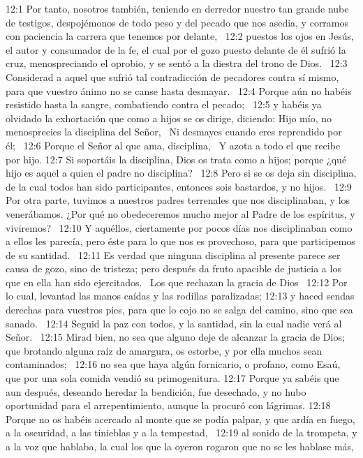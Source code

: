 12:1 Por tanto, nosotros también, teniendo en derredor nuestro tan grande nube de testigos, despojémonos de todo peso y del pecado que nos asedia, y corramos con paciencia la carrera que tenemos por delante,  
12:2 puestos los ojos en Jesús, el autor y consumador de la fe, el cual por el gozo puesto delante de él sufrió la cruz, menospreciando el oprobio, y se sentó a la diestra del trono de Dios.  
12:3 Considerad a aquel que sufrió tal contradicción de pecadores contra sí mismo, para que vuestro ánimo no se canse hasta desmayar.  
12:4 Porque aún no habéis resistido hasta la sangre, combatiendo contra el pecado;  
12:5 y habéis ya olvidado la exhortación que como a hijos se os dirige, diciendo: 
Hijo mío, no menosprecies la disciplina del Señor,  
Ni desmayes cuando eres reprendido por él;  
12:6 Porque el Señor al que ama, disciplina,  
Y azota a todo el que recibe por hijo. 
12:7 Si soportáis la disciplina, Dios os trata como a hijos; porque ¿qué hijo es aquel a quien el padre no disciplina?  
12:8 Pero si se os deja sin disciplina, de la cual todos han sido participantes, entonces sois bastardos, y no hijos.  
12:9 Por otra parte, tuvimos a nuestros padres terrenales que nos disciplinaban, y los venerábamos. ¿Por qué no obedeceremos mucho mejor al Padre de los espíritus, y viviremos?  
12:10 Y aquéllos, ciertamente por pocos días nos disciplinaban como a ellos les parecía, pero éste para lo que nos es provechoso, para que participemos de su santidad.  
12:11 Es verdad que ninguna disciplina al presente parece ser causa de gozo, sino de tristeza; pero después da fruto apacible de justicia a los que en ella han sido ejercitados.  
Los que rechazan la gracia de Dios  
12:12 Por lo cual, levantad las manos caídas y las rodillas paralizadas; 
12:13 y haced sendas derechas para vuestros pies, para que lo cojo no se salga del camino, sino que sea sanado.  
12:14 Seguid la paz con todos, y la santidad, sin la cual nadie verá al Señor.  
12:15 Mirad bien, no sea que alguno deje de alcanzar la gracia de Dios; que brotando alguna raíz de amargura, os estorbe, y por ella muchos sean contaminados;  
12:16 no sea que haya algún fornicario, o profano, como Esaú, que por una sola comida vendió su primogenitura. 
12:17 Porque ya sabéis que aun después, deseando heredar la bendición, fue desechado, y no hubo oportunidad para el arrepentimiento, aunque la procuró con lágrimas. 
12:18 Porque no os habéis acercado al monte que se podía palpar, y que ardía en fuego, a la oscuridad, a las tinieblas y a la tempestad,  
12:19 al sonido de la trompeta, y a la voz que hablaba, la cual los que la oyeron rogaron que no se les hablase más, 
